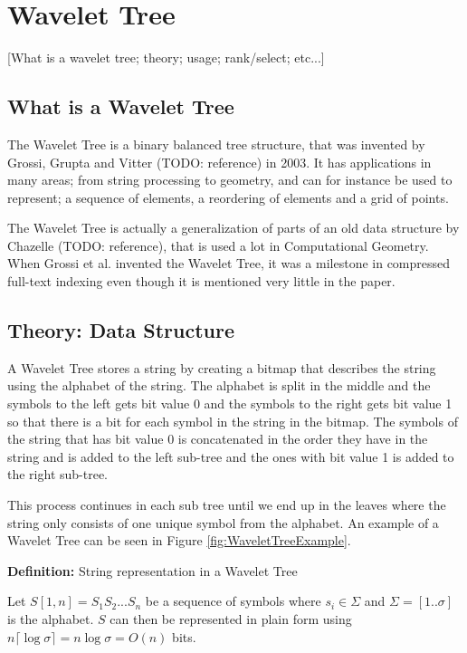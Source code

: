 \section{Wavelet Tree}

[What is a wavelet tree; theory; usage; rank/select; etc...]

\subsection{What is a Wavelet Tree}
The Wavelet Tree is a binary balanced tree structure, that was invented by Grossi, Grupta and Vitter (TODO: reference) in 2003. It has applications in many areas; from string processing to geometry, and can for instance be used to represent; a sequence of elements, a reordering of elements and a grid of points. 

The Wavelet Tree is actually a generalization of parts of an old data structure by Chazelle (TODO: reference), that is used a lot in Computational Geometry. When Grossi et al. invented the Wavelet Tree, it was a milestone in compressed full-text indexing even though it is mentioned very little in the paper.

\subsection{Theory: Data Structure}
A Wavelet Tree stores a string by creating a bitmap that describes the string using the alphabet of the string. The alphabet is split in the middle and the symbols to the left gets bit value 0 and the symbols to the right gets bit value 1 so that there is a bit for each symbol in the string in the bitmap. The symbols of the string that has bit value 0 is concatenated in the order they have in the string and is added to the left sub-tree and the ones with bit value 1 is added to the right sub-tree. 

This process continues in each sub tree until we end up in the leaves where the string only consists of one unique symbol from the alphabet. An example of a Wavelet Tree can be seen in Figure \ref{fig:WaveletTreeExample}.

\begin{mdframed}[nobreak]
\textbf{Definition:} String representation in a Wavelet Tree

Let $S[1,n] = S_1 S_2 ... S_n$ be a sequence of symbols where $s_i \in \Sigma$ and $\Sigma = [1 .. \sigma]$ is the alphabet. $S$ can then be represented in plain form using $n \lceil \log \sigma \rceil = n \log \sigma = O(n)$ bits.
\end{mdframed}


